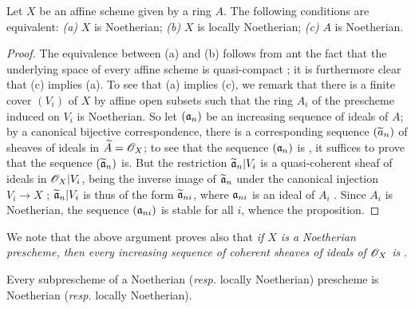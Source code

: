 \begin{prop}[6.1.3]
\label{1.6.1.3}
Let $X$ be an affine scheme given by a ring $A$.
The following conditions are equivalent:
\emph{(a)} $X$ is Noetherian;
\emph{(b)} $X$ is locally Noetherian;
\emph{(c)} $A$ is Noetherian.
\end{prop}

\begin{proof}
\label{proof-1.6.1.3}
The equivalence between (a) and (b) follows from  ant the fact that the underlying space of every affine scheme is quasi-compact ; it is furthermore clear that (c) implies (a).
To see that (a) implies (c), we remark that there is a finite cover $(V_i)$ of $X$ by affine open subsets such that the ring $A_i$ of the prescheme induced on $V_i$ is Noetherian.
So let $(\mathfrak{a}_n)$ be an increasing sequence of ideals of $A$; by a canonical bijective correspondence, there is a corresponding sequence $(\widetilde{a}_n)$ of sheaves of ideals in $\widetilde{A}=\mathscr{O}_X$;
to see that the sequence $(\mathfrak{a}_n)$ is , it suffices to prove that the sequence $(\widetilde{\mathfrak{a}}_n)$ is.
But the restriction $\widetilde{\mathfrak{a}}_n|V_i$ is a quasi-coherent sheaf of ideals in $\mathscr{O}_X|V_i$, being the inverse image of $\widetilde{\mathfrak{a}}_n$ under the canonical injection $V_i\to X$ ;
$\widetilde{\mathfrak{a}}_n|V_i$ is thus of the form $\widetilde{\mathfrak{a}}_{ni}$, where $\mathfrak{a}_{ni}$ is an ideal of $A_i$ .
Since $A_i$ is Noetherian, the sequence $(\mathfrak{a}_{ni})$ is stable for all $i$, whence the proposition.
\end{proof}

We note that the above argument proves also that \emph{if $X$ is a Noetherian prescheme, then every increasing sequence of coherent sheaves of ideals of $\mathscr{O}_X$ is }.

\begin{prop}[6.1.4]
\label{1.6.1.4}
Every subprescheme of a Noetherian (\emph{resp.} locally Noetherian) prescheme is Noetherian (\emph{resp.} locally Noetherian).
\end{prop}

